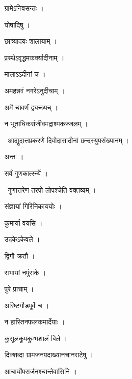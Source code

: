 \documentclass[10pt, openany, oneside]{book}
\begin{document}
\noindent ग्रामेऽनिवसन्तः ।

\noindent घोषादिषु ।

\noindent छात्र्यादयः शालायाम् ।

\noindent प्रस्थेऽवृद्धमकर्क्यादीनाम् ।

\noindent मालाऽऽदीनां च ।

\noindent अमहन्नवं नगरेऽनुदीचाम् ।

\noindent अर्मे चावर्णं द्व्यच्त्र्यच् ।

\noindent न भूताधिकसंजीवमद्राश्मकज्जलम् ।

\par\noindent\hspace{1.5em}{\vps वा॰}~{\qt आद्युदात्तप्रकरणे दिवोदासादीनां छन्दस्युपसंख्यानम् ।}

\noindent अन्तः ।

\noindent सर्वं गुणकार्त्स्न्ये ।

\par\noindent\hspace{1.5em}{\vps वा॰}~{\qt गुणात्तरेण तरपो लोपश्चेति वक्तव्यम् ।}

\noindent संज्ञायां गिरिनिकाययोः ।

\noindent कुमार्यां वयसि ।

\noindent उदकेऽकेवले ।

\noindent द्विगौ क्रतौ ।

\noindent सभायां नपुंसके ।

\noindent पुरे प्राचाम् ।

\noindent अरिष्टगौडपूर्वे च ।

\noindent न हास्तिनफलकमार्देयाः ।

\noindent कुसूलकूपकुम्भशालं बिले ।

\noindent दिक्शब्दा ग्रामजनपदाख्यानचानराटेषु ।

\noindent आचार्योपसर्जनश्चान्तेवासिनि ।
\end{document}
